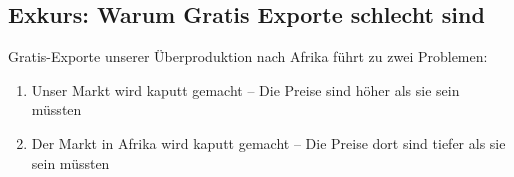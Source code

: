 % 
% 
% 
\subsection{Exkurs: Warum Gratis Exporte schlecht sind}
Gratis-Exporte unserer Überproduktion nach Afrika führt zu zwei Problemen:
\begin{enumerate}
	\item Unser Markt wird kaputt gemacht -- Die Preise sind höher als sie sein müssten
	\item Der Markt in Afrika wird kaputt gemacht -- Die Preise dort sind tiefer als sie sein müssten
\end{enumerate}
% 
% 
